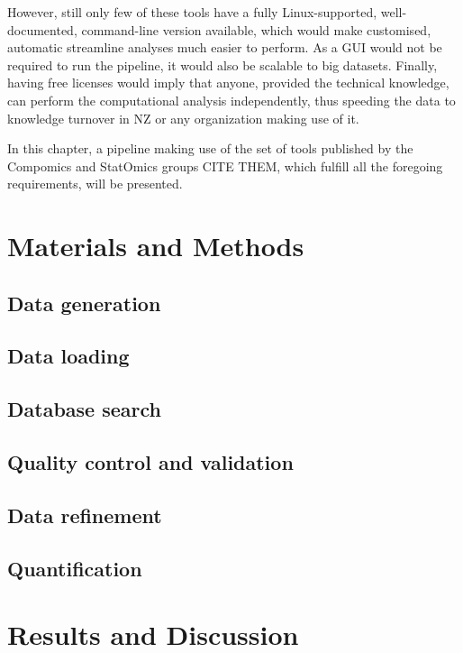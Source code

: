 \documentclass[11pt, a4paper]{report}
\begin{document}
However, still only few of these tools have a fully Linux-supported, well-documented, command-line version available, which would make customised, automatic streamline analyses much easier to perform. As a GUI would not be required to run the pipeline, it would also be scalable to big datasets. Finally, having free licenses would imply that anyone, provided the technical knowledge, can perform the computational analysis independently, thus speeding the data to knowledge turnover in \ac{NZ} or any organization making use of it.

In this chapter, a pipeline making use of the set of tools published by the Compomics  and StatOmics groups CITE THEM, which fulfill all the foregoing requirements, will be presented.

\section{Materials and Methods}

\subsection{Data generation}

\subsection{Data loading}

\subsection{Database search}

\subsection{Quality control and validation}

\subsection{Data refinement}

\subsection{Quantification}


\section{Results and Discussion}
\end{document}
